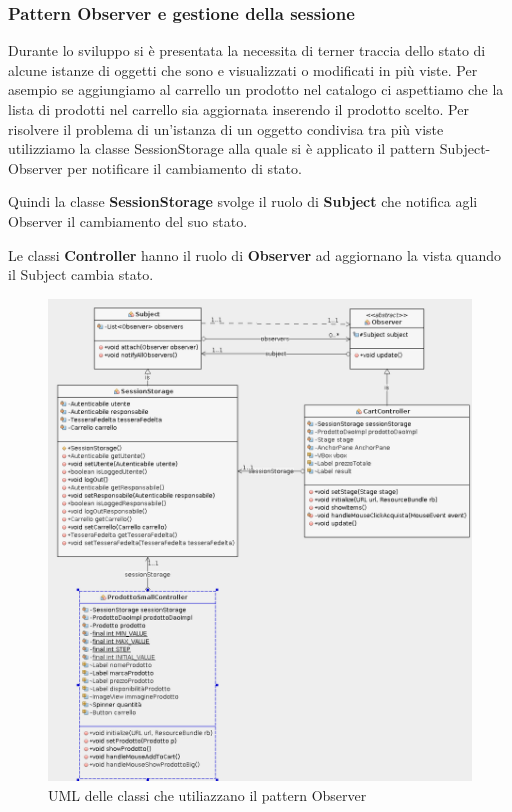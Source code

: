 \documentclass{article}
\begin{document}
\subsubsection{Pattern Observer e gestione della sessione}
Durante lo sviluppo si è presentata la necessita di terner traccia dello stato di alcune istanze di oggetti che
sono e visualizzati o modificati in più viste.
Per asempio se aggiungiamo al carrello un prodotto nel catalogo ci aspettiamo che la lista di prodotti nel
carrello sia aggiornata inserendo il prodotto scelto.
Per risolvere il problema di un'istanza di un oggetto condivisa tra più viste utilizziamo la classe SessionStorage
alla quale si è applicato il pattern Subject-Observer per notificare il cambiamento di stato.


\noindent Quindi la classe \textbf{SessionStorage} svolge il ruolo di \textbf{Subject} che notifica agli
Observer il cambiamento del suo stato.


\noindent Le classi \textbf{Controller} hanno il ruolo di \textbf{Observer} ad aggiornano la vista quando
il Subject cambia stato.

\begin{figure}[h!]
	\centering
	\includegraphics[width=\textwidth]{UmlObserver.png}
	\caption{UML delle classi che utiliazzano il pattern Observer}
	\label{fig:UmlProdotto}
\end{figure}
\newpage
\end{document}
